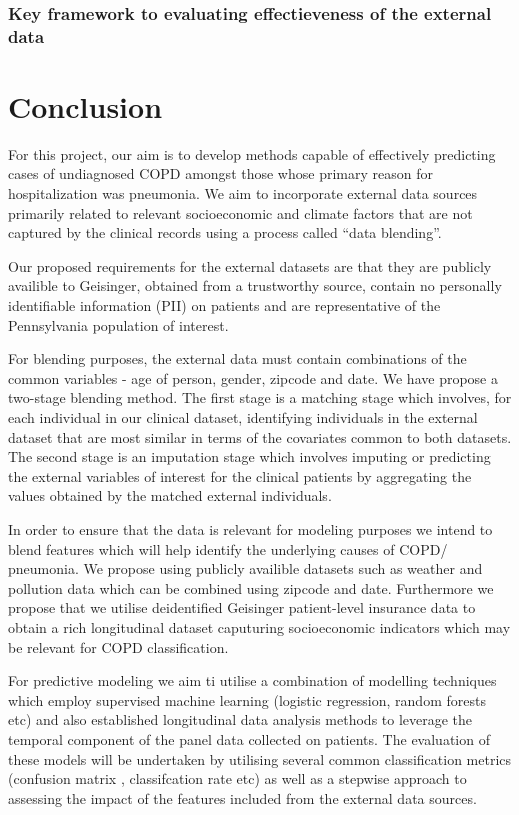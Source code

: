 \documentclass{article}
\begin{document}
\subsubsection{Key framework to evaluating effectieveness of the external data}

\section{Conclusion}
For this project, our aim is to develop methods capable of effectively 
predicting cases of undiagnosed COPD amongst those whose primary reason for 
hospitalization was pneumonia. We aim to incorporate external data sources 
primarily related to relevant socioeconomic and climate factors that 
are not captured by the clinical records using a process called ``data blending''.

Our proposed requirements for the external datasets are that they are publicly
availible to Geisinger, obtained from a trustworthy source, contain no personally 
identifiable information (PII) on patients and are representative of the 
Pennsylvania population of interest.

For blending purposes, the external data must contain combinations of the common
variables - age of person, gender, zipcode and date. We have propose a two-stage 
blending method. The first stage is a matching stage which involves, for each 
individual in our clinical dataset, identifying individuals in the external 
dataset that are most similar in terms of the covariates common to both datasets. 
The second stage is an imputation stage which involves imputing or predicting 
the external variables of interest for the clinical patients by aggregating the 
values obtained by the matched external individuals.

In order to ensure that the data is relevant for modeling purposes we intend to 
blend features which will help identify the underlying causes of COPD/ pneumonia. 
We propose using publicly availible datasets such as weather and pollution data 
which can be combined using zipcode and date. Furthermore we propose that we utilise
deidentified Geisinger patient-level insurance data to obtain a rich longitudinal dataset    
caputuring socioeconomic indicators which may be relevant for COPD classification.

For predictive modeling we aim ti utilise a combination of modelling techniques
which employ supervised machine learning (logistic regression, random forests etc) 
and also established longitudinal data analysis methods to leverage the temporal 
component of the panel data collected on patients. The evaluation of these 
models will be undertaken by utilising several common classification metrics (confusion matrix
, classifcation rate etc) as well as a stepwise approach to assessing the 
impact of the features included from the external data sources.
\end{document}
